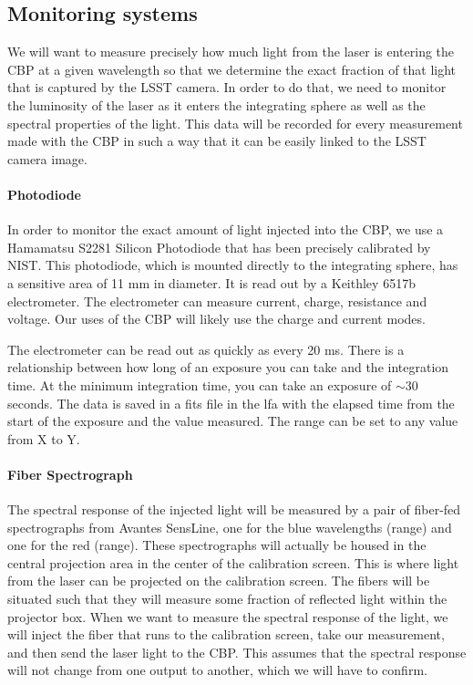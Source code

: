 \documentclass[SE,authoryear,lsstdraft,toc]{lsstdoc}
\begin{document}
\subsection{Monitoring systems}

We will want to measure precisely how much light from the laser is entering the CBP at a given wavelength so that we determine the exact fraction of that light that is captured by the LSST camera. In order to do that, we need to monitor the luminosity of the laser as it enters the integrating sphere as well as the spectral properties of the light. This data will be recorded for every measurement made with the CBP in such a way that it can be easily linked to the LSST camera image.

\paragraph{\textbf{Photodiode}}

In order to monitor the exact amount of light injected into the CBP, we use a Hamamatsu S2281 Silicon Photodiode that has been precisely calibrated by NIST.
This photodiode, which is mounted directly to the integrating sphere, has a sensitive area of 11 mm in diameter. It is read out by a Keithley 6517b electrometer. The electrometer can measure current, charge, resistance and voltage. Our uses of the CBP will likely use the charge and current modes.

The electrometer can be read out as quickly as every 20 ms. There is a relationship between how long of an exposure you can take and the integration time. At the minimum integration time, you can take an exposure of $\sim$30 seconds. The data is saved in a fits file in the lfa with the elapsed time from the start of the exposure and the value measured. The range can be set to any value from X to Y.

\paragraph{\textbf{Fiber Spectrograph}}

The spectral response of the injected light will be measured by a pair of fiber-fed spectrographs from Avantes SensLine, one for the blue wavelengths (range) and one for the red (range). These spectrographs will actually be housed in the central projection area in the center of the calibration screen. This is where light from the laser can be projected on the calibration screen. The fibers will be situated such that they will measure some fraction of reflected light within the projector box. When we want to measure the spectral response of the light, we will inject the fiber that runs to the calibration screen, take our measurement, and then send the laser light to the CBP. This assumes that the spectral response will not change from one output to another, which we will have to confirm.
\end{document}
